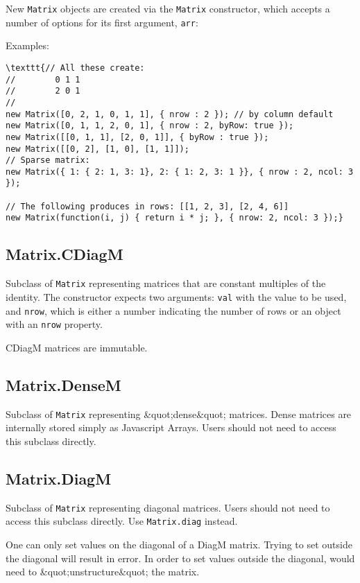\documentclass{article}
\begin{document}
New \texttt{Matrix} objects are created via the \texttt{Matrix} constructor, which accepts
a number of options for its first argument, \texttt{arr}:



Examples:


\begin{lstlisting}
\texttt{// All these create:
//        0 1 1
//        2 0 1
//
new Matrix([0, 2, 1, 0, 1, 1], { nrow : 2 }); // by column default
new Matrix([0, 1, 1, 2, 0, 1], { nrow : 2, byRow: true });
new Matrix([[0, 1, 1], [2, 0, 1]], { byRow : true });
new Matrix([[0, 2], [1, 0], [1, 1]]);
// Sparse matrix:
new Matrix({ 1: { 2: 1, 3: 1}, 2: { 1: 2, 3: 1 }}, { nrow : 2, ncol: 3 });

// The following produces in rows: [[1, 2, 3], [2, 4, 6]]
new Matrix(function(i, j) { return i * j; }, { nrow: 2, ncol: 3 });}\end{lstlisting}

    \subsection*{Matrix.CDiagM}
    Subclass of \texttt{Matrix} representing matrices that are constant multiples of
the identity. The constructor expects two arguments: \texttt{val} with the value to be
used, and \texttt{nrow}, which is either a number indicating the number of rows or
an object with an \texttt{nrow} property.


CDiagM matrices are immutable.


    \subsection*{Matrix.DenseM}
    Subclass of \texttt{Matrix} representing \&quot;dense\&quot; matrices.
Dense matrices are internally stored simply as Javascript Arrays.
Users should not need to access this subclass directly.


    \subsection*{Matrix.DiagM}
    Subclass of \texttt{Matrix} representing diagonal matrices.
Users should not need to access this subclass directly. Use \texttt{Matrix.diag} instead.


One can only set values on the diagonal of a DiagM matrix.
Trying to set outside the diagonal will result in error.
In order to set values outside the diagonal, would need to
\&quot;unstructure\&quot; the matrix.
\end{document}
